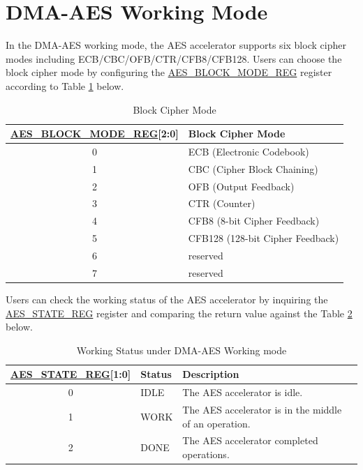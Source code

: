 \documentclass[main\_\_EN.tex]{subfiles}
\begin{document}

\section{DMA-AES Working Mode}\label{sec:aes-dma-aes}

In the DMA-AES working mode, the AES accelerator supports six block cipher modes including ECB/CBC/OFB/CTR/CFB8/CFB128. Users can choose the block cipher mode by configuring the \hyperref[regdesc:AESBLOCKMODEREG]{AES\_BLOCK\_MODE\_REG} register according to Table \ref{tab:aes-block-mode} below.

\begin{longtable}[c]{ | c | l | }
\caption{Block Cipher Mode}
\label{tab:aes-block-mode}
\\\hline 
\rowcolor{lightgray}
\hyperref[regdesc:AESBLOCKMODEREG]{AES\_BLOCK\_MODE\_REG}[2:0]     & Block Cipher Mode\\
    \hline
    0                          & ECB (Electronic Codebook)    \\
    \hline
    1                          & CBC (Cipher Block Chaining)     \\
    \hline
    2                          & OFB (Output Feedback)    \\
    \hline
    3                          & CTR (Counter)    \\
    \hline
    4                          & CFB8 (8-bit Cipher Feedback)    \\
    \hline
    5                          & CFB128 (128-bit Cipher Feedback) \\
    \hline
    6                         & reserved \\
    \hline
    7                         & reserved \\
    \hline
\end{longtable}

Users can check the working status of the AES accelerator by inquiring the \hyperref[regdesc:AESSTATEREG]{AES\_STATE\_REG} register and comparing the return value against the Table \ref{tab:aes-state-value-dma} below.

\begin{longtable}[c]{ | c | l | l | }
\caption{Working Status under DMA-AES Working mode}
\label{tab:aes-state-value-dma}
\\\hline 
\rowcolor{lightgray}
\hyperref[regdesc:AESSTATEREG]{AES\_STATE\_REG}[1:0] & Status &  Description \\ \hline

    0                   & IDLE      &   The AES accelerator is idle.\\ \hline
    1                   & WORK      &   The AES accelerator is in the middle of an operation.     \\ \hline
    2                   & DONE      &   The AES accelerator completed operations.     \\ \hline
\end{longtable}
\end{document}
